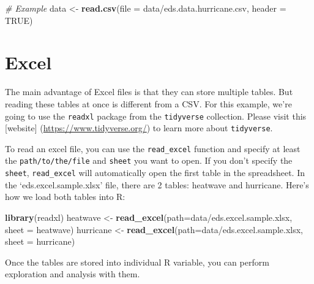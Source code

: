\documentclass[
]{book}
\newenvironment{Shaded}{\begin{snugshade}}{\end{snugshade}}
\newcommand{\CommentTok}[1]{\textcolor[rgb]{0.56,0.35,0.01}{\textit{#1}}}
\newcommand{\DataTypeTok}[1]{\textcolor[rgb]{0.13,0.29,0.53}{#1}}
\newcommand{\KeywordTok}[1]{\textcolor[rgb]{0.13,0.29,0.53}{\textbf{#1}}}
\newcommand{\NormalTok}[1]{#1}
\newcommand{\OtherTok}[1]{\textcolor[rgb]{0.56,0.35,0.01}{#1}}
\newcommand{\StringTok}[1]{\textcolor[rgb]{0.31,0.60,0.02}{#1}}
\begin{document}
\begin{Shaded}
\begin{Highlighting}[]
\CommentTok{\# Example}
\NormalTok{data \textless{}{-}}\StringTok{ }\KeywordTok{read.csv}\NormalTok{(}\DataTypeTok{file =} \StringTok{\textquotesingle{}data/eds.data.hurricane.csv\textquotesingle{}}\NormalTok{, }\DataTypeTok{header =} \OtherTok{TRUE}\NormalTok{)}
\end{Highlighting}
\end{Shaded}

\hypertarget{excel}{%
\section{Excel}\label{excel}}

The main advantage of Excel files is that they can store multiple tables. But reading these tables at once is different from a CSV. For this example, we're going to use the \texttt{readxl} package from the \texttt{tidyverse} collection. Please visit this {[}website{]} (\url{https://www.tidyverse.org/}) to learn more about \texttt{tidyverse}.

To read an excel file, you can use the \texttt{read\_excel} function and specify at least the \texttt{path/to/the/file} and \texttt{sheet} you want to open. If you don't specify the \texttt{sheet}, \texttt{read\_excel} will automatically open the first table in the spreadsheet.
In the `eds.excel.sample.xlsx' file, there are 2 tables: heatwave and hurricane. Here's how we load both tables into R:

\begin{Shaded}
\begin{Highlighting}[]
\KeywordTok{library}\NormalTok{(readxl)}
\NormalTok{heatwave \textless{}{-}}\StringTok{  }\KeywordTok{read\_excel}\NormalTok{(}\DataTypeTok{path=}\StringTok{\textquotesingle{}data/eds.excel.sample.xlsx\textquotesingle{}}\NormalTok{, }\DataTypeTok{sheet =} \StringTok{\textquotesingle{}heatwave\textquotesingle{}}\NormalTok{)}
\NormalTok{hurricane \textless{}{-}}\StringTok{  }\KeywordTok{read\_excel}\NormalTok{(}\DataTypeTok{path=}\StringTok{\textquotesingle{}data/eds.excel.sample.xlsx\textquotesingle{}}\NormalTok{, }\DataTypeTok{sheet =} \StringTok{\textquotesingle{}hurricane\textquotesingle{}}\NormalTok{)}
\end{Highlighting}
\end{Shaded}

Once the tables are stored into individual R variable, you can perform exploration and analysis with them.
\end{document}
